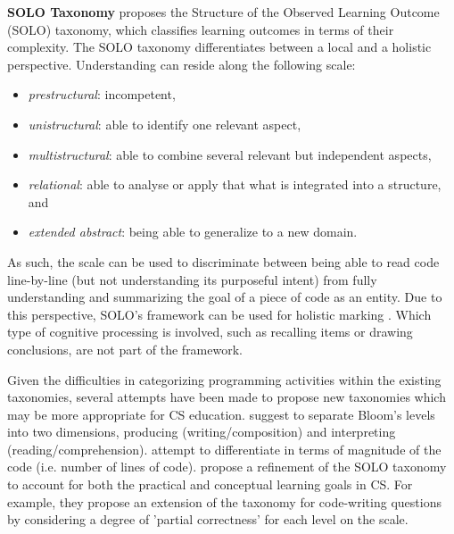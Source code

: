\noindent \textbf{SOLO Taxonomy}\newline
{} proposes the Structure of the Observed Learning Outcome (SOLO) taxonomy, which classifies learning outcomes in terms of their complexity. The SOLO taxonomy differentiates between a local and a holistic perspective. Understanding can reside along the following scale:
\begin{itemize}
\item \emph{prestructural}: incompetent,
\item \emph{unistructural}: able to identify one relevant aspect,
\item \emph{multistructural}: able to combine several relevant but independent aspects,
\item \emph{relational}: able to analyse or apply that what is integrated into a structure, and
\item \emph{extended abstract}: being able to generalize to a new domain.
\end{itemize}
 As such, the scale can be used to discriminate between being able to read code line-by-line (but not understanding its purposeful intent) from fully understanding and summarizing the goal of a piece of code as an entity. Due to this perspective, SOLO's framework can be used for holistic marking \cite{Fuller2007}. Which type of cognitive processing is involved, such as recalling items or drawing conclusions, are not part of the framework.





Given the difficulties in categorizing programming activities within the existing taxonomies, several attempts have been made to propose new taxonomies which may be more appropriate for CS education.  suggest to separate Bloom’s levels into two dimensions, producing (writing/composition) and interpreting (reading/comprehension).  attempt to differentiate in terms of magnitude of the code (i.e. number of lines of code).  propose a refinement of the SOLO taxonomy to account for both the practical and conceptual learning goals in CS. For example, they propose an extension of the taxonomy for code-writing questions by considering a degree of 'partial correctness' for each level on the scale.


